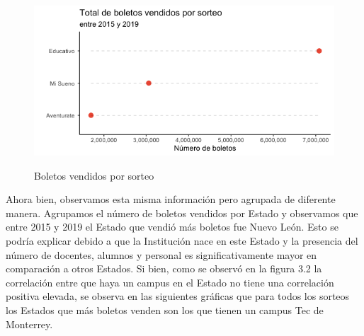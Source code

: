 \begin{figure}[H]
    \caption{Boletos vendidos por sorteo}
    \label{fig:bolvendidos}
    \includegraphics[scale = 0.5]{Imagenes/n_boletos.png} \\
    \centering
\end{figure} 

Ahora bien, observamos esta misma información pero agrupada de diferente manera. Agrupamos el número de boletos vendidos por Estado y observamos que entre 2015 y 2019 el Estado que vendió más boletos fue Nuevo León. Esto se podría explicar debido a que la Institución nace en este Estado y la presencia del número de docentes, alumnos y personal es significativamente mayor en comparación a otros Estados. Si bien, como se observó en la figura 3.2 la correlación entre que haya un campus en el Estado no tiene una correlación positiva elevada, se observa en las siguientes gráficas que para todos los sorteos los Estados que más boletos venden son los que tienen un campus Tec de Monterrey.

